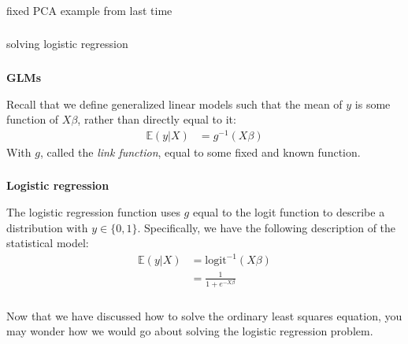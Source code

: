 \begin{frame}[fragile] \frametitle{}

{\color{yaleblue}\fontsize{16pt}{20pt}\selectfont fixed PCA example from last time}

\end{frame}

\begin{frame}[fragile] \frametitle{}

{\color{yaleblue}\fontsize{16pt}{20pt}\selectfont solving logistic regression}

\end{frame}

\begin{frame}[fragile] \frametitle{}

\textbf{GLMs}

Recall that we define generalized linear models such that
the mean of $y$ is some function of $X\beta$, rather than
directly equal to it:
\begin{align*}
\mathbb{E} (y | X) &= g^{-1} \left( X \beta \right)
\end{align*}
With $g$, called the \textit{link function}, equal to some
fixed and known function.

\end{frame}


\begin{frame}[fragile] \frametitle{}

\textbf{Logistic regression}

The logistic regression function uses $g$ equal to the logit
function to describe a distribution with $y \in \{0,1\}$.
Specifically, we have the following description of the statistical
model:
\begin{align*}
\mathbb{E} (y | X) &= \text{logit}^{-1} \left( X \beta \right) \\
&= \frac{1}{1 + e^{- X \beta}}
\end{align*}

\end{frame}

\begin{frame}[fragile] \frametitle{}

Now that we have discussed how to solve the ordinary least squares
equation, you may wonder how we would go about solving the logistic
regression problem.

\end{frame}

